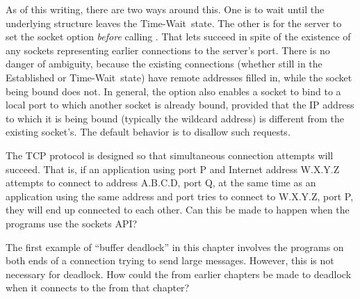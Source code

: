 As of this writing, there are two ways around this.  One
is to wait until the underlying structure leaves the
Time-Wait\ state.  The other is for the server to set the
 socket option  \emph{before\/} calling
. That lets  succeed in spite of the existence
of any sockets representing earlier connections to the server's port.
%
There is no danger of ambiguity, because the existing connections
(whether still in the Established or Time-Wait\ state) have remote
addresses filled in, while the socket being bound does not.
In general, the  option also
enables a socket
to bind to a local port to which another socket is already bound,
provided that the IP address to which it is
being bound (typically the wildcard 
address)
is different from the existing socket's.
The default  behavior is to disallow such requests.

\begin{exercises}

\item The TCP protocol is designed so that simultaneous connection
attempts will succeed.  That is, if an application using port P and
Internet address W.X.Y.Z attempts to connect to address A.B.C.D, port
Q, at the same time as an application using the same address and port
tries to connect to W.X.Y.Z, port P, they will end up connected to
each other.  Can this be made to happen when the programs use the
sockets API?

\item The first example of ``buffer deadlock'' in this chapter
involves the programs on {both} ends of a connection trying to send
large messages.  However, this is not necessary for deadlock.  How
could the  from earlier chapters be made
to deadlock when 
it connects to the  from that chapter?

\end{exercises}

